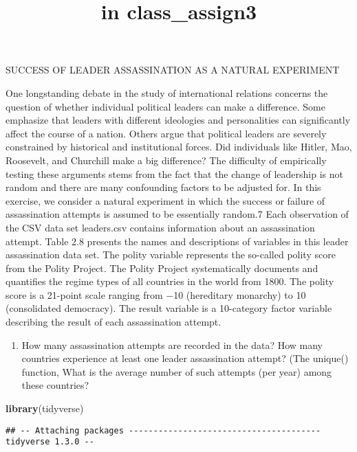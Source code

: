 \documentclass[
]{article}
\title{in class\_assign3}
\author{}
\date{\vspace{-2.5em}}
\newenvironment{Shaded}{\begin{snugshade}}{\end{snugshade}}
\newcommand{\KeywordTok}[1]{\textcolor[rgb]{0.13,0.29,0.53}{\textbf{#1}}}
\newcommand{\NormalTok}[1]{#1}
\providecommand{\tightlist}{%
  \setlength{\itemsep}{0pt}\setlength{\parskip}{0pt}}
\begin{document}
\maketitle

SUCCESS OF LEADER ASSASSINATION AS A NATURAL EXPERIMENT

One longstanding debate in the study of international relations concerns
the question of whether individual political leaders can make a
difference. Some emphasize that leaders with different ideologies and
personalities can significantly affect the course of a nation. Others
argue that political leaders are severely constrained by historical and
institutional forces. Did individuals like Hitler, Mao, Roosevelt, and
Churchill make a big difference? The difficulty of empirically testing
these arguments stems from the fact that the change of leadership is not
random and there are many confounding factors to be adjusted for. In
this exercise, we consider a natural experiment in which the success or
failure of assassination attempts is assumed to be essentially random.7
Each observation of the CSV data set leaders.csv contains information
about an assassination attempt. Table 2.8 presents the names and
descriptions of variables in this leader assassination data set. The
polity variable represents the so-called polity score from the Polity
Project. The Polity Project systematically documents and quantifies the
regime types of all countries in the world from 1800. The polity score
is a 21-point scale ranging from −10 (hereditary monarchy) to 10
(consolidated democracy). The result variable is a 10-category factor
variable describing the result of each assassination attempt.

\begin{enumerate}
\def\labelenumi{\arabic{enumi}.}
\tightlist
\item
  How many assassination attempts are recorded in the data? How many
  countries experience at least one leader assassination attempt? (The
  unique() function, What is the average number of such attempts (per
  year) among these countries?
\end{enumerate}

\begin{Shaded}
\begin{Highlighting}[]
\KeywordTok{library}\NormalTok{(tidyverse)}
\end{Highlighting}
\end{Shaded}

\begin{verbatim}
## -- Attaching packages --------------------------------------- tidyverse 1.3.0 --
\end{verbatim}
\end{document}
